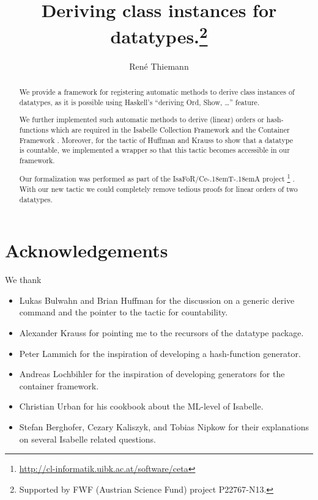 \documentclass[11pt,a4paper]{article}
\newcommand\isafor{\textsf{IsaFoR}}
\newcommand\ceta{\textsf{Ce\kern-.18emT\kern-.18emA}}
\begin{document}
\title{Deriving class instances for datatypes.\footnote{Supported by FWF (Austrian Science Fund) project P22767-N13.}}
\author{Ren\'e Thiemann}
\maketitle

\begin{abstract}
  We provide a framework for registering automatic methods 
  to derive class instances 
  of datatypes, 
  as it is possible using Haskell's ``deriving Ord, Show, \ldots'' feature.
  
  We further implemented such automatic methods to derive (linear) orders or
  hash-functions which are required in the 
  Isabelle Collection Framework \cite{rbt} and the Container Framework \cite{containers}. 
  Moreover, for the tactic of
  Huffman and Krauss to show that a datatype is countable, we implemented a 
  wrapper so that this tactic becomes accessible in our framework.
  
  Our formalization was performed as part of the \isafor/\ceta{} project%
  \footnote{\url{http://cl-informatik.uibk.ac.at/software/ceta}} \cite{CeTA}.
  With our new tactic we could completely remove 
  tedious proofs for linear orders of two datatypes.
\end{abstract}

\tableofcontents




\section{Acknowledgements}
We thank 
\begin{itemize}
\item Lukas Bulwahn and Brian Huffman for the discussion on a generic derive command and 
  the pointer to
  the tactic for countability.
\item Alexander Krauss for pointing me to the
  recursors of the datatype package.
\item Peter Lammich for the inspiration of developing a hash-function generator.
\item Andreas Lochbihler for the inspiration of developing generators for the container framework.
\item Christian Urban for his cookbook about the ML-level of Isabelle.
\item Stefan Berghofer, Cezary Kaliszyk, and Tobias Nipkow for their explanations
  on several Isabelle related questions.
\end{itemize}



\end{document}
